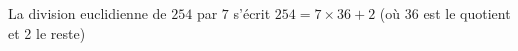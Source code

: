 
La division euclidienne de $254$ par $7$ s'écrit $254=7 \times 36 + 2$ (où 36 est le quotient et 2 le reste) 